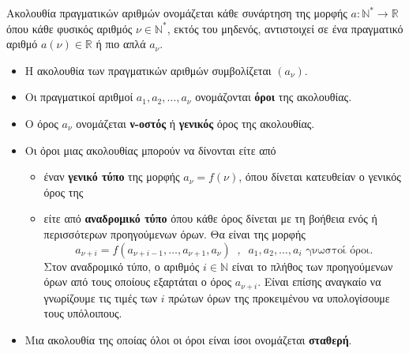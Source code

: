 Ακολουθία πραγματικών αριθμών ονομάζεται κάθε συνάρτηση της μορφής $ a:\mathbb{N}^*\rightarrow\mathbb{R} $ όπου κάθε φυσικός αριθμός $ \nu\in\mathbb{N}^* $, εκτός του μηδενός, αντιστοιχεί σε ένα πραγματικό αριθμό $ a(\nu)\in\mathbb{R} $ ή πιο απλά $ a_\nu $.
\begin{itemize}[itemsep=0mm]
\item Η ακολουθία των πραγματικών αριθμών συμβολίζεται $ \left( a_\nu\right)  $.
\item Οι πραγματικοί αριθμοί $ a_1, a_2,\ldots,a_\nu $ ονομάζονται \textbf{όροι} της ακολουθίας.
\item Ο όρος $ a_\nu $ ονομάζεται \textbf{ν-οστός} ή \textbf{γενικός} όρος της ακολουθίας.
\item Οι όροι μιας ακολουθίας μπορούν να δίνονται είτε από 
\begin{itemize}[itemsep=0mm]
\item έναν \textbf{γενικό τύπο} της μορφής $ a_\nu=f(\nu) $, όπου δίνεται κατευθείαν ο γενικός όρος της
\item είτε από \textbf{αναδρομικό τύπο} όπου κάθε όρος δίνεται με τη βοήθεια ενός ή περισσότερων προηγούμενων όρων. Θα είναι της μορφής \[ a_{\nu+i}=f(a_{\nu+i-1},\ldots,a_{\nu+1},a_\nu)\;\;,\;\;a_1,a_2,\ldots,a_i\textrm{ γνωστοί όροι.} \]
Στον αναδρομικό τύπο, ο αριθμός $ i\in\mathbb{N} $ είναι το πλήθος των προηγούμενων όρων από τους οποίους εξαρτάται ο όρος $ a_{\nu+i} $. Είναι επίσης αναγκαίο να γνωρίζουμε τις τιμές των $ i $ πρώτων όρων της προκειμένου να υπολογίσουμε τους υπόλοιπους.
\end{itemize}
\item Μια ακολουθία της οποίας όλοι οι όροι είναι ίσοι ονομάζεται \textbf{σταθερή}.
\end{itemize}
